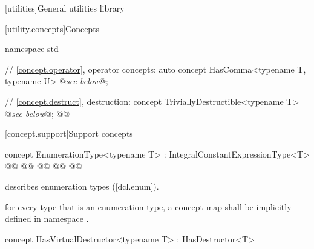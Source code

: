 \documentclass[american,twoside]{book}
\begin{document}

\renewcommand{\sectionmark}[1]{\markright{\thesection\hspace{1em}#1}}
\renewcommand{\chaptermark}[1]{\markboth{#1}{}}

\setcounter{chapter}{19}
[utilities]{General utilities library}

[utility.concepts]{Concepts}

\begin{codeblock}
namespace std {
  // \ref{concept.operator}, operator concepts:
  auto concept HasComma<typename T, typename U> @\textit{see below}@;

  // \ref{concept.destruct}, destruction:
  concept TriviallyDestructible<typename T> @\textit{see below}@;
  @@
}
\end{codeblock}

\setcounter{section}{2}
[concept.support]{Support concepts}
\setcounter{Paras}{33}
\begin{itemdecl}
concept EnumerationType<typename T> : IntegralConstantExpressionType<T> {
  @@
  @@
        @@
        @@
        @@
}
\end{itemdecl}

\begin{itemdescr}
\pnum
\mbox{\reallynote} describes enumeration types
([dcl.enum]). 

\pnum
\mbox{\requires}
for every type \mbox{} that is an enumeration type, a concept map
\mbox{} shall be implicitly defined in namespace
\mbox{}.
\end{itemdescr}

\setcounter{section}{6}
\setcounter{Paras}{5}
\color{addclr}
\begin{itemdecl}
concept HasVirtualDestructor<typename T> : HasDestructor<T> { }
\end{itemdecl}
\end{document}
